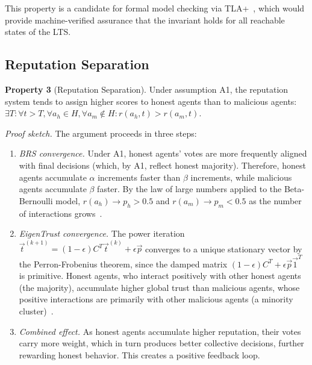 \documentclass[11pt]{article}
\begin{document}
This property is a candidate for formal model checking via TLA+~\cite{lamport2002}, which would provide machine-verified assurance that the invariant holds for all reachable states of the LTS.

\subsection{Reputation Separation}

\textbf{Property 3} (Reputation Separation). Under assumption A1, the reputation system tends to assign higher scores to honest agents than to malicious agents: $\exists T: \forall t > T, \forall a_h \in H, \forall a_m \notin H: r(a_h, t) > r(a_m, t)$.

\textit{Proof sketch.} The argument proceeds in three steps:

\begin{enumerate}
\item \textit{BRS convergence.} Under A1, honest agents' votes are more frequently aligned with final decisions (which, by A1, reflect honest majority). Therefore, honest agents accumulate $\alpha$ increments faster than $\beta$ increments, while malicious agents accumulate $\beta$ faster. By the law of large numbers applied to the Beta-Bernoulli model, $r(a_h) \rightarrow p_h > 0.5$ and $r(a_m) \rightarrow p_m < 0.5$ as the number of interactions grows~\cite{josang2002}.

\item \textit{EigenTrust convergence.} The power iteration $\vec{t}^{(k+1)} = (1-\epsilon) C^T \vec{t}^{(k)} + \epsilon \vec{p}$ converges to a unique stationary vector by the Perron-Frobenius theorem, since the damped matrix $(1-\epsilon)C^T + \epsilon \vec{p}\vec{1}^T$ is primitive. Honest agents, who interact positively with other honest agents (the majority), accumulate higher global trust than malicious agents, whose positive interactions are primarily with other malicious agents (a minority cluster)~\cite{kamvar2003}.

\item \textit{Combined effect.} As honest agents accumulate higher reputation, their votes carry more weight, which in turn produces better collective decisions, further rewarding honest behavior. This creates a positive feedback loop.
\end{enumerate}
\end{document}
